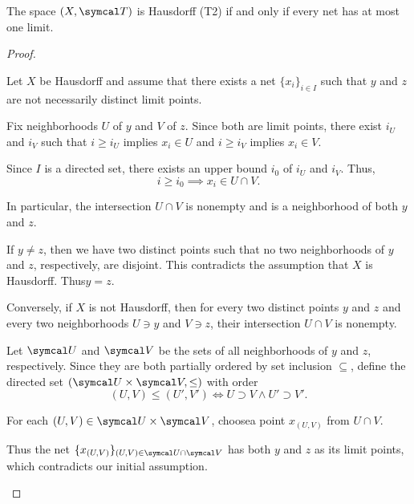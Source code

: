\begin{proposition}\label{thm:t2_iff_singleton_limits}
  The space \( (X, \Cal{T}) \) is Hausdorff (T2) if and only if every net has at most one limit.
\end{proposition}
\begin{proof}
  \begin{description}
    \Implies Let \( X \) be Hausdorff and assume that there exists a net \( \{ x_i \}_{i \in I} \) such that \( y \) and \( z \) are not necessarily distinct limit points.

    Fix neighborhoods \( U \) of \( y \) and \( V \) of \( z \). Since both are limit points, there exist \( i_U \) and \( i_V \) such that \( i \geq i_U \) implies \( x_i \in U \) and \( i \geq i_V \) implies \( x_i \in V \).

    Since \( I \) is a directed set, there exists an upper bound \( i_0 \) of \( i_U \) and \( i_V \). Thus,
    \begin{equation*}
      i \geq i_0 \implies x_i \in U \cap V.
    \end{equation*}

    In particular, the intersection \( U \cap V \) is nonempty and is a neighborhood of both \( y \) and \( z \).

    If \( y \neq z \), then we have two distinct points such that no two neighborhoods of \( y \) and \( z \), respectively, are disjoint. This contradicts the assumption that \( X \) is Hausdorff. Thus\LEM \( y = z \).

    \ImpliedBy Conversely, if \( X \) is not Hausdorff\LEM, then for every two distinct points \( y \) and \( z \) and every two neighborhoods \( U \ni y \) and \( V \ni z \), their intersection \( U \cap V \) is nonempty.

    Let \( \Cal{U} \) and \( \Cal{V} \) be the sets of all neighborhoods of \( y \) and \( z \), respectively. Since they are both partially ordered by set inclusion \( \subseteq \), define the directed set \( (\Cal{U} \times \Cal{V}, \leq) \) with order
    \begin{equation*}
      (U, V) \leq (U', V') \iff U \supset V \land U' \supset V'.
    \end{equation*}

    For each \( (U, V) \in \Cal{U} \times \Cal{V} \), choose\AOC a point \( x_{(U, V)} \) from \( U \cap V \).

    Thus the net \( \{ x_{(U, V)} \}_{(U, V) \in \Cal{U} \cap \Cal{V}} \) has both \( y \) and \( z \) as its limit points, which contradicts our initial assumption.
  \end{description}
\end{proof}

